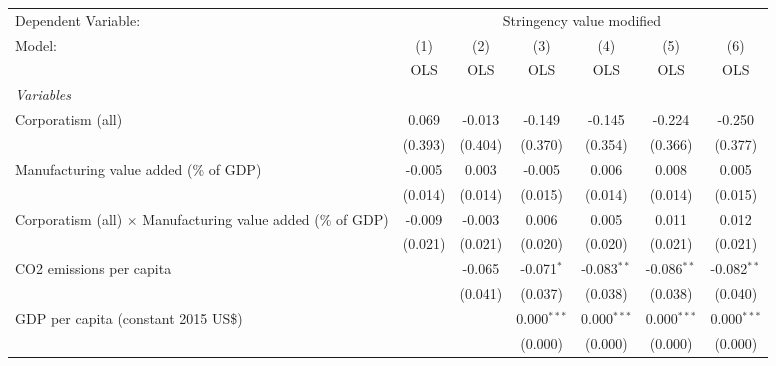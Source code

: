
\begingroup
\centering
\begin{tabular}{lcccccc}
   \toprule
   Dependent Variable: & \multicolumn{6}{c}{Stringency value modified}\\
   Model:                                                             & (1)     & (2)     & (3)           & (4)           & (5)           & (6)\\  
                                                                      &  OLS    & OLS     & OLS           & OLS           & OLS           & OLS\\  
   \midrule
   \emph{Variables}\\
   Corporatism (all)                                                  & 0.069   & -0.013  & -0.149        & -0.145        & -0.224        & -0.250\\   
                                                                      & (0.393) & (0.404) & (0.370)       & (0.354)       & (0.366)       & (0.377)\\   
   Manufacturing value added (\% of GDP)                              & -0.005  & 0.003   & -0.005        & 0.006         & 0.008         & 0.005\\   
                                                                      & (0.014) & (0.014) & (0.015)       & (0.014)       & (0.014)       & (0.015)\\   
   Corporatism (all) $\times$ Manufacturing value added (\% of GDP)   & -0.009  & -0.003  & 0.006         & 0.005         & 0.011         & 0.012\\   
                                                                      & (0.021) & (0.021) & (0.020)       & (0.020)       & (0.021)       & (0.021)\\   
   CO2 emissions per capita                                           &         & -0.065  & -0.071$^{*}$  & -0.083$^{**}$ & -0.086$^{**}$ & -0.082$^{**}$\\   
                                                                      &         & (0.041) & (0.037)       & (0.038)       & (0.038)       & (0.040)\\   
   GDP per capita (constant 2015 US\$)                                &         &         & 0.000$^{***}$ & 0.000$^{***}$ & 0.000$^{***}$ & 0.000$^{***}$\\   
                                                                      &         &         & (0.000)       & (0.000)       & (0.000)       & (0.000)\\   

\end{tabular}
